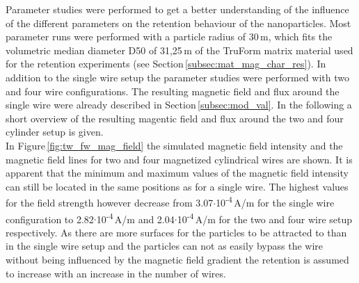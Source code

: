 Parameter studies were performed to get a better understanding of the influence of the different parameters on the retention behaviour of the nanoparticles.
Most parameter runs were performed with a particle radius of 30\,\textmu m, which fits the volumetric median diameter D50 of 31,25\,\textmu m of the TruForm matrix material used for the retention experiments (see Section\,\ref{subsec:mat_mag_char_res}). In addition to the single wire setup the parameter studies were performed with two and four wire configurations. The resulting magnetic field and flux around the single wire were already described in Section\,\ref{subsec:mod_val}. In the following a short overview of the resulting magentic field and flux around the two and four cylinder setup is given. \\
In Figure\,\ref{fig:tw_fw_mag_field} the simulated magnetic field intensity and the magnetic field lines for two and four magnetized cylindrical wires are shown. It is apparent that the minimum and maximum values of the magnetic field intensity can still be located in the same positions as for a single wire. The highest values for the field strength however decrease from 3.07$\cdotp$10\textsuperscript{-4}\,A/m for the single wire configuration to 2.82$\cdotp$10\textsuperscript{-4}\,A/m and 2.04$\cdotp$10\textsuperscript{-4}\,A/m for the two and four wire setup respectively. As there are more surfaces for the particles to be attracted to than in the single wire setup and the particles can not as easily bypass the wire without being influenced by the magnetic field gradient the retention is assumed to increase with an increase in the number of wires.  


